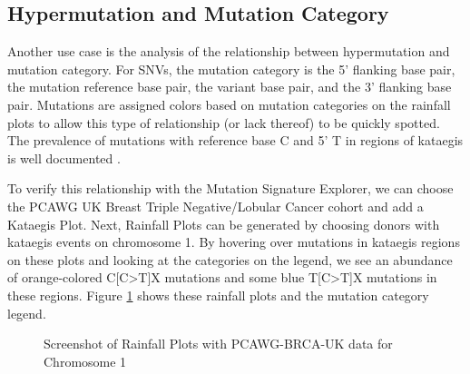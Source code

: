 \documentclass[12pt, letterpaper]{article}
\begin{document}
\subsection{Hypermutation and Mutation Category}
Another use case is the analysis of the relationship between hypermutation and mutation category.
For SNVs, the mutation category is the 5' flanking base pair, the mutation reference base pair, the variant base pair, and the 3' flanking base pair.
Mutations are assigned colors based on mutation categories on the rainfall plots to allow this type of relationship (or lack thereof) to be quickly spotted.
The prevalence of mutations with reference base C and 5' T in regions of kataegis is well documented \cite{taylor2013dna}.

To verify this relationship with the Mutation Signature Explorer, we can choose the PCAWG UK Breast Triple Negative/Lobular Cancer cohort and add a Kataegis Plot.
Next, Rainfall Plots can be generated by choosing donors with kataegis events on chromosome 1.
By hovering over mutations in kataegis regions on these plots and looking at the categories on the legend, we see an abundance of orange-colored C[C\textgreater T]X mutations and some blue T[C\textgreater T]X mutations in these regions.
Figure \ref{fig:caseStudy2} shows these rainfall plots and the mutation category legend.
\begin{figure}[h]
    \centering
    \caption{Screenshot of Rainfall Plots with PCAWG-BRCA-UK data for Chromosome 1}
    \label{fig:caseStudy2}
\end{figure}
\end{document}
